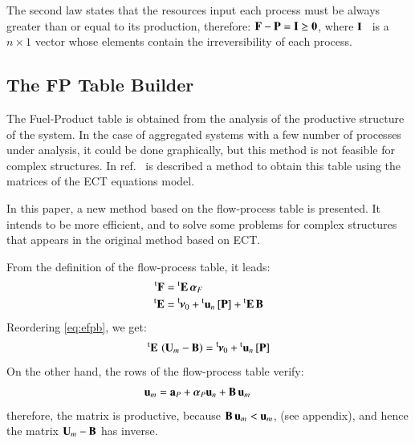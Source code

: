 \documentclass{ecos2018}
\begin{document}
The second law states that the resources input each process must be always greater than or equal to its production, therefore: $\mathbf{F}-\mathbf{P}=\mathbf{I} \ge \mathbf{0}$, where $\mathbf{I}$~ is a $n \times 1$ vector whose elements contain the irreversibility of each process.

\subsection{The FP Table Builder}
The Fuel-Product table is obtained from the analysis of the productive structure of the system. In the case of aggregated systems with a few number of processes under analysis, it could be done graphically, but this method is not feasible for complex structures. In ref.~\cite{TAESS} is described a method to obtain this table using the matrices of the ECT equations model.

In this paper, a new method based on the flow-process table is presented. It intends to be more efficient, and to solve some problems for complex structures that appears in the original method based on ECT.

From the definition of the flow-process table, it leads:
\begin{align}
\prescript{\smash{\mathrm{t}}}{}{\mathbf{F}}&=\prescript{\smash{\mathrm{t}}}{}{\mathbf{E}}\,\bm{\alpha}_F \label{eq:ffpa}\\
\prescript{\smash{\mathrm{t}}}{}{\mathbf{E}}&=\prescript{\smash{\mathsf{t}}}{}{\mskip-1mu}\bm{\nu}_0+\prescript{\smash{\mathrm{t}}}{}{\mathbf{u}}_n\,[\mathbf{P}]+\prescript{\smash{\mathrm{t}}}{}{\mathbf{E}}\,\mathbf{B}\label{eq:efpb}
\end{align}
Reordering \cref{eq:efpb}, we get:
\begin{equation}
\prescript{\smash{\mathrm{t}}}{}{\mathbf{E}}\,\left(\mathbf{U}_m -\mathbf{B}\right) = \prescript{\smash{\mathsf{t}}}{}{\mskip-1mu}\bm{\nu}_0 +\prescript{\smash{\mathrm{t}}}{}{\mathbf{u}}_n\,[\mathbf{P}]
\label{eq:efpb1}
\end{equation}
On the other hand, the rows of the flow-process table verify:
\begin{equation}
\mathbf{u}_m=\mathbf{a}_P+\bm{\alpha}_P \mathbf{u}_n + \mathbf{B}\,\mathbf{u}_m \qquad   \label{eq:umb}
\end{equation}
therefore, the matrix  is productive, because $\mathbf{B}\,\mathbf{u}_m < \mathbf{u}_m$, (see appendix), and hence the matrix $\mathbf{U}_m - \mathbf{B}$ has inverse.
\end{document}
